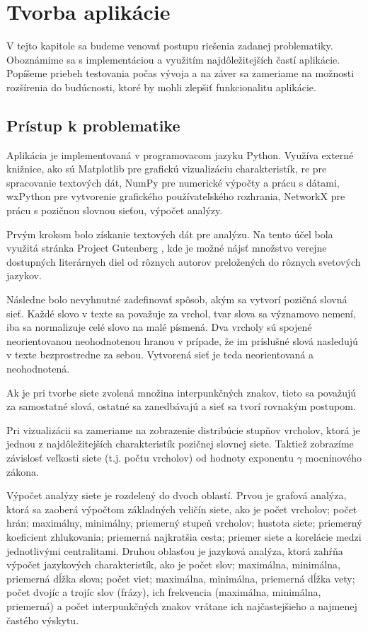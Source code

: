 \chapter{Tvorba aplikácie}\label{ch:appCreation}

V tejto kapitole sa budeme venovať postupu riešenia zadanej problematiky. Oboznámime sa s implementáciou a využitím najdôležitejších
častí aplikácie. Popíšeme priebeh testovania počas vývoja a na záver sa zameriame na možnosti rozšírenia do budúcnosti, ktoré
by mohli zlepšiť funkcionalitu aplikácie.

\section{Prístup k problematike}\label{sec:solutionApproach}

Aplikácia je implementovaná v programovacom jazyku Python. Využíva externé knižnice, ako sú Matplotlib pre grafickú vizualizáciu
charakteristík, re pre spracovanie textových dát, NumPy pre numerické výpočty a prácu s dátami, wxPython pre vytvorenie grafického
používateľského rozhrania, NetworkX pre prácu s pozičnou slovnou sieťou, výpočet analýzy.

Prvým krokom bolo získanie textových dát pre analýzu. Na tento účel bola využitá stránka Project Gutenberg \cite{projectgutenberg} ,
kde je možné nájsť množstvo verejne dostupných literárnych diel od rôznych autorov preložených do rôznych svetových jazykov.

Následne bolo nevyhnutné zadefinovať spôsob, akým sa vytvorí pozičná slovná sieť. Každé slovo v texte sa považuje za vrchol,
tvar slova sa významovo nemení, iba sa normalizuje celé slovo na malé písmená. Dva vrcholy sú spojené neorientovanou neohodnotenou
hranou v prípade, že im príslušné slová nasledujú v texte bezprostredne za sebou. Vytvorená sieť je teda neorientovaná a neohodnotená.

Ak je pri tvorbe siete zvolená množina interpunkčných znakov, tieto sa považujú za samostatné slová, ostatné sa zanedbávajú a sieť sa tvorí
rovnakým postupom.

Pri vizualizácii sa zameriame na zobrazenie distribúcie stupňov vrcholov, ktorá je jednou z najdôležitejších charakteristík
pozičnej slovnej siete. Taktiež zobrazíme závislosť veľkosti siete (t.j. počtu vrcholov) od hodnoty exponentu $\gamma$ mocninového zákona.

Výpočet analýzy siete je rozdelený do dvoch oblastí. Prvou je grafová analýza, ktorá sa zaoberá výpočtom základných veličín siete, ako je
počet vrcholov; počet hrán; maximálny, minimálny, priemerný stupeň vrcholov; hustota siete; priemerný koeficient zhlukovania; priemerná
najkratšia cesta; priemer siete a korelácie medzi jednotlivými centralitami. Druhou oblasťou je jazyková analýza, ktorá zahŕňa výpočet
jazykových charakteristík, ako je počet slov; maximálna, minimálna, priemerná dĺžka slova; počet viet; maximálna, minimálna, priemerná dĺžka vety;
počet dvojíc a trojíc slov (frázy), ich frekvencia (maximálna, minimálna, priemerná) a počet interpunkčných znakov vrátane ich najčastejšieho a najmenej
častého výskytu.

